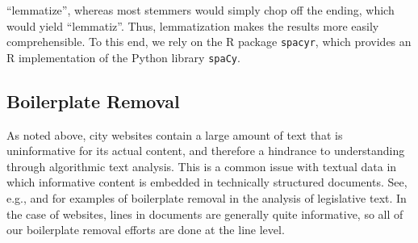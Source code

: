 \documentclass[11pt]{article}
\begin{document}
``lemmatize'', whereas most stemmers would simply chop off the ending, which would yield ``lemmatiz''. Thus, lemmatization makes the results more easily comprehensible. To this end, we rely on the R package \texttt{spacyr}, which provides an R implementation of the Python library \texttt{spaCy}.

\subsection{Boilerplate Removal}\label{boilerplate}
As noted above, city websites contain a large amount of text that is uninformative for its actual content, and therefore a hindrance to understanding through algorithmic text analysis. This is a common issue with textual data in which informative content is embedded in technically structured documents. See, e.g., \citet{burgess2016legislative,wilkerson2015tracing} and \citet{linder2018text} for examples of boilerplate removal in the analysis of legislative text. In the case of websites, lines in documents are generally quite informative, so all of our boilerplate removal efforts are done at the line level.

\end{document}
